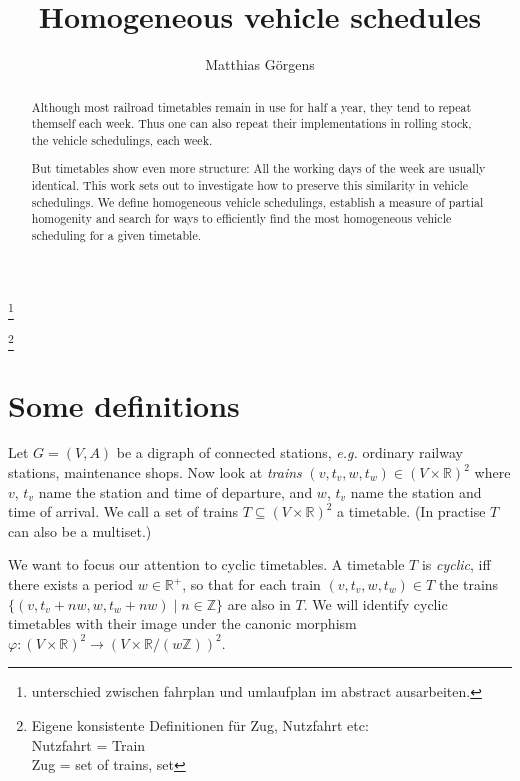 \documentclass[a4paper]{amsart} %
\author{Matthias Görgens}
\def\eg{\emph{e.g.}}
\newcommand{\todo}[1]{\footnote{#1}}
\begin{document}
\title{Homogeneous vehicle schedules}

\begin{abstract}
  Although most railroad timetables remain in use for half a
  year, they tend to repeat themself each week.  Thus one can also
  repeat their implementations in rolling stock, the vehicle
  schedulings, each week.

  But timetables show even more structure: All the working days of the
  week are usually identical.  This work sets out to investigate how
  to preserve this similarity in vehicle schedulings.  We define
  homogeneous vehicle schedulings, establish a measure of partial
  homogenity and search for ways to efficiently find the most
  homogeneous vehicle scheduling for a given timetable.
\end{abstract}

\maketitle
\todo{unterschied zwischen fahrplan und umlaufplan im abstract ausarbeiten.}

\todo{Eigene konsistente Definitionen für Zug, Nutzfahrt etc:\\
Nutzfahrt = Train\\
Zug = set of trains, set}
\section{Some definitions}

Let \(G=(V,A)\) be a digraph of connected stations, \eg{} ordinary
railway stations, maintenance shops.  Now look at \label{trains}
\textit{trains} \((v, t_v, w, t_w) \in \left(V \times \mathbb{R}\right)^2 \)
where \(v\), \(t_v\) name the station and time of departure, and
\(w\), \(t_v\) name the station and time of arrival.  We call a set of
trains \(T \subseteq \left(V \times \mathbb{R}\right)^2\) a timetable.  (In
practise \(T\) can also be a multiset.)

We want to focus our attention to cyclic timetables.  A timetable \(T\)
is \label{cyclic} \textit{cyclic}, iff there exists a period \(w \in
\mathbb{R}^+\), so that for each train \((v, t_v, w, t_w) \in T\)
the trains \(\{(v, t_v+n w, w, t_w +n w) \mid n \in \mathbb{Z}\}\)
are also in \(T\).  We will identify cyclic timetables with their
image under the canonic morphism
\(\varphi \colon \left(V \times \mathbb{R}\right)^2
\to \left(V \times \mathbb{R}/{\left(w \mathbb{Z}\right)}\right)^2\).
\end{document}
